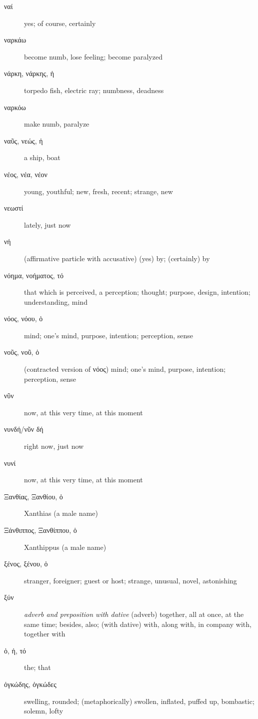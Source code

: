 \documentclass[12pt,letterpaper]{article}
\begin{document}
\begin{description}
    \item[\textgreek{ναί}] \marginnote{*}yes; of course, certainly
    \item[\textgreek{ναρκάω}] become numb, lose feeling; become paralyzed
    \item[\textgreek{νάρκη, νάρκης, ἡ}] torpedo fish, electric ray; numbness, deadness
    \item[\textgreek{ναρκόω}] make numb, paralyze
    \item[\textgreek{ναῦς, νεώς, ἡ}] \marginnote{*}a ship, boat
    \item[\textgreek{νέος, νέα, νέον}] \marginnote{*}young, youthful; new, fresh, recent; strange, new
    \item[\textgreek{νεωστί}] lately, just now
    \item[\textgreek{νή}] (affirmative particle with accusative) (yes) by; (certainly) by
    \item[\textgreek{νόημα, νοήματος, τό}] that which is perceived, a perception; thought; purpose, design, intention; understanding, mind
    \item[\textgreek{νόος, νόου, ὁ}] \marginnote{*}mind; one's mind, purpose, intention; perception, sense
    \item[\textgreek{νοῦς, νοῦ, ὁ}] \marginnote{*}(contracted version of \textgreek{νόος}) mind; one's mind, purpose, intention; perception, sense
    \item[\textgreek{νῦν}] \marginnote{*}now, at this very time, at this moment
    \item[\textgreek{νυνδή/νῦν δή}] right now, just now
    \item[\textgreek{νυνί}] \marginnote{*}now, at this very time, at this moment
    \item[\textgreek{Ξανθίας, Ξανθίου, ὁ}] Xanthias (a male name)
    \item[\textgreek{Ξάνθιππος, Ξανθίππου, ὁ}] Xanthippus (a male name)
    \item[\textgreek{ξένος, ξένου, ὁ}] \marginnote{*}stranger, foreigner; guest or host; strange, unusual, novel, astonishing
    \item[\textgreek{ξύν}] \marginnote{*}\textit{adverb and preposition with dative} (adverb) together, all at once, at the same time; besides, also; (with dative) with, along with, in company with, together with
    \item[\textgreek{ὁ, ἡ, τό}] \marginnote{*}the; that
    \item[\textgreek{ὀγκώδης, ὀγκώδες}] swelling, rounded; (metaphorically) swollen, inflated, puffed up, bombastic; solemn, lofty 

\end{description}
\end{document}
